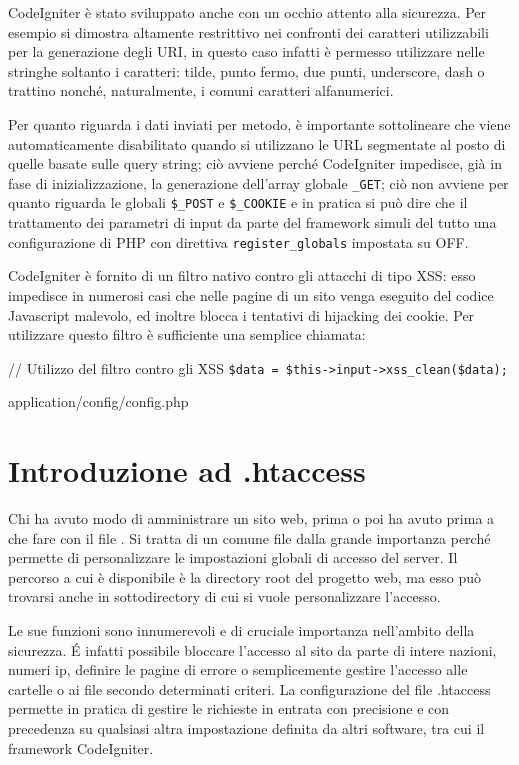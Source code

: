 CodeIgniter è stato sviluppato anche con un occhio attento alla sicurezza. Per esempio si dimostra altamente restrittivo nei confronti dei caratteri utilizzabili per la generazione degli \ac{URI}, in questo caso infatti è permesso utilizzare nelle stringhe soltanto i caratteri: tilde, punto fermo, due punti, underscore, dash o trattino nonché, naturalmente, i comuni caratteri alfanumerici.

Per quanto riguarda i dati inviati per metodo, è importante sottolineare che  viene automaticamente disabilitato quando si utilizzano le \ac{URL} segmentate al posto di quelle basate sulle query string; ciò avviene perché CodeIgniter impedisce, già in fase di inizializzazione, la generazione dell'array globale \verb|_GET|; ciò non avviene per quanto riguarda le globali \verb|$_POST| e \verb|$_COOKIE| e in pratica si può dire che il trattamento dei parametri di input da parte del framework simuli del tutto una configurazione di \ac{PHP} con direttiva \verb|register_globals| impostata su OFF.

CodeIgniter è fornito di un filtro nativo contro gli attacchi di tipo \ac{XSS}: esso impedisce in numerosi casi che nelle pagine di un sito venga eseguito del codice Javascript malevolo, ed inoltre blocca i tentativi di hijacking dei cookie. Per utilizzare questo filtro è sufficiente una semplice chiamata:

\begin{code}
// Utilizzo del filtro contro gli XSS
\verb|$data = $this->input->xss_clean($data);|
\end{code}

\begin{code}
application/config/config.php
\end{code}

\section*{Introduzione ad .htaccess}
Chi ha avuto modo di amministrare un sito web, prima o poi ha avuto prima a che fare con il file . Si tratta di un comune file dalla grande importanza perché permette di personalizzare le impostazioni globali di accesso del server. Il percorso a cui è disponibile è la directory root del progetto web, ma esso può trovarsi anche in sottodirectory di cui si vuole personalizzare l'accesso.

Le sue funzioni sono innumerevoli e di cruciale importanza nell'ambito della sicurezza. \'E infatti possibile bloccare l'accesso al sito da parte di intere nazioni, numeri ip, definire le pagine di errore o semplicemente gestire l'accesso alle cartelle o ai file secondo determinati criteri. La configurazione del file .htaccess permette in pratica di gestire le richieste in entrata con precisione e con precedenza su qualsiasi altra impostazione definita da altri software, tra cui il framework CodeIgniter.

